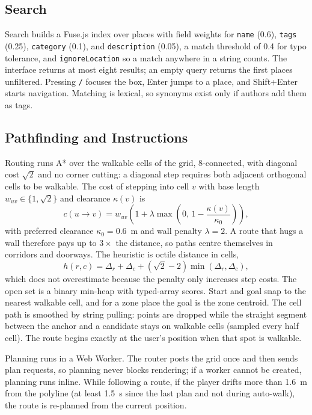 \documentclass[conference]{IEEEtran}
\begin{document}
\subsection{Search}
Search builds a Fuse.js index \cite{fusejs} over places with field weights for \texttt{name} (0.6), \texttt{tags} (0.25), \texttt{category} (0.1), and \texttt{description} (0.05), a match threshold of 0.4 for typo tolerance, and \texttt{ignoreLocation} so a match anywhere in a string counts. The interface returns at most eight results; an empty query returns the first places unfiltered. Pressing \texttt{/} focuses the box, Enter jumps to a place, and Shift+Enter starts navigation. Matching is lexical, so synonyms exist only if authors add them as tags.

\subsection{Pathfinding and Instructions}
Routing runs A* \cite{hart1968astar} over the walkable cells of the grid, 8-connected, with diagonal cost $\sqrt{2}$ and no corner cutting: a diagonal step requires both adjacent orthogonal cells to be walkable. The cost of stepping into cell $v$ with base length $w_{uv}\in\{1,\sqrt{2}\}$ and clearance $\kappa(v)$ is
\begin{equation}
c(u\!\to\!v) = w_{uv}\left(1 + \lambda \max\!\left(0,\, 1 - \frac{\kappa(v)}{\kappa_0}\right)\right),
\end{equation}
with preferred clearance $\kappa_0 = 0.6$~m and wall penalty $\lambda = 2$. A route that hugs a wall therefore pays up to $3\times$ the distance, so paths centre themselves in corridors and doorways. The heuristic is octile distance in cells,
\begin{equation}
h(r,c) = \Delta_r + \Delta_c + (\sqrt{2}-2)\min(\Delta_r,\Delta_c),
\end{equation}
which does not overestimate because the penalty only increases step costs. The open set is a binary min-heap with typed-array scores. Start and goal snap to the nearest walkable cell, and for a zone place the goal is the zone centroid. The cell path is smoothed by string pulling: points are dropped while the straight segment between the anchor and a candidate stays on walkable cells (sampled every half cell). The route begins exactly at the user's position when that spot is walkable.

Planning runs in a Web Worker. The router posts the grid once and then sends plan requests, so planning never blocks rendering; if a worker cannot be created, planning runs inline. While following a route, if the player drifts more than 1.6~m from the polyline (at least 1.5~s since the last plan and not during auto-walk), the route is re-planned from the current position.
\end{document}
